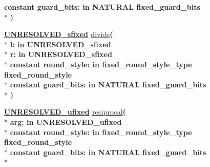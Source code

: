 \begin{DoxyCompactItemize}
{\bfseries {\bfseries \textcolor{keywordflow}{constant}\textcolor{vhdlchar}{ }}\textcolor{vhdlchar}{guard\+\_\+bits\+: }\textcolor{stringliteral}{in }\textcolor{vhdlchar}{N\+A\+T\+U\+R\+A\+L     fixed\+\_\+guard\+\_\+bits}}\\*
{\bfseries  )} 
\item 
{\bfseries {\bfseries {\bfseries \hyperlink{classfixed__pkg_aa723b28a027c3c0f9bca02d75e8df4d6}{U\+N\+R\+E\+S\+O\+L\+V\+E\+D\+\_\+sfixed}} \textcolor{vhdlchar}{ }}} \hyperlink{classfixed__pkg_a776ac0d7e64687407983f0b3853bb478}{divide}{\bfseries  ( }\\*
{\bfseries \textcolor{vhdlchar}{l\+: }\textcolor{stringliteral}{in }\textcolor{vhdlchar}{U\+N\+R\+E\+S\+O\+L\+V\+E\+D\+\_\+sfixed}}\\*
{\bfseries \textcolor{vhdlchar}{r\+: }\textcolor{stringliteral}{in }\textcolor{vhdlchar}{U\+N\+R\+E\+S\+O\+L\+V\+E\+D\+\_\+sfixed}}\\*
{\bfseries {\bfseries \textcolor{keywordflow}{constant}\textcolor{vhdlchar}{ }}\textcolor{vhdlchar}{round\+\_\+style\+: }\textcolor{stringliteral}{in }\textcolor{vhdlchar}{fixed\+\_\+round\+\_\+style\+\_\+type     fixed\+\_\+round\+\_\+style}}\\*
{\bfseries {\bfseries \textcolor{keywordflow}{constant}\textcolor{vhdlchar}{ }}\textcolor{vhdlchar}{guard\+\_\+bits\+: }\textcolor{stringliteral}{in }\textcolor{vhdlchar}{N\+A\+T\+U\+R\+A\+L     fixed\+\_\+guard\+\_\+bits}}\\*
{\bfseries  )} 
\item 
{\bfseries {\bfseries {\bfseries \hyperlink{classfixed__pkg_ae78bc2b36d22f6abeac163955e8a587d}{U\+N\+R\+E\+S\+O\+L\+V\+E\+D\+\_\+ufixed}} \textcolor{vhdlchar}{ }}} \hyperlink{classfixed__pkg_a4437e0396c5ce246806b13f9c9c5a400}{reciprocal}{\bfseries  ( }\\*
{\bfseries \textcolor{vhdlchar}{arg\+: }\textcolor{stringliteral}{in }\textcolor{vhdlchar}{U\+N\+R\+E\+S\+O\+L\+V\+E\+D\+\_\+ufixed}}\\*
{\bfseries {\bfseries \textcolor{keywordflow}{constant}\textcolor{vhdlchar}{ }}\textcolor{vhdlchar}{round\+\_\+style\+: }\textcolor{stringliteral}{in }\textcolor{vhdlchar}{fixed\+\_\+round\+\_\+style\+\_\+type     fixed\+\_\+round\+\_\+style}}\\*
{\bfseries {\bfseries \textcolor{keywordflow}{constant}\textcolor{vhdlchar}{ }}\textcolor{vhdlchar}{guard\+\_\+bits\+: }\textcolor{stringliteral}{in }\textcolor{vhdlchar}{N\+A\+T\+U\+R\+A\+L     fixed\+\_\+guard\+\_\+bits}}\\*

\end{DoxyCompactItemize}
